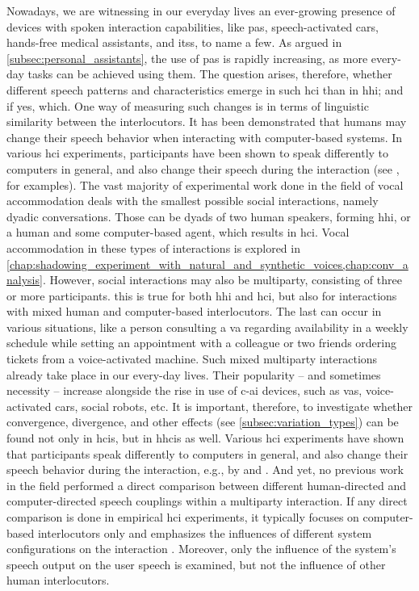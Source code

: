 Nowadays, we are witnessing in our everyday lives an ever-growing presence of devices with spoken interaction capabilities, like \acp{pa}, speech-activated cars, hands-free medical assistants, and \acp{its}, to name a few.
As argued in \cref{subsec:personal_assistants}, the use of \acp{pa} is rapidly increasing, as more every-day tasks can be achieved using them.
The question arises, therefore, whether different speech patterns and characteristics emerge in such \ac{hci} than in \ac{hhi}; and if yes, which.
One way of measuring such changes is in terms of linguistic similarity between the interlocutors.
It has been demonstrated that humans may change their speech behavior when interacting with computer-based systems.
In various \ac{hci} experiments, participants have been shown to speak differently to computers in general, and also change their speech during the interaction (see \citet{Branigan2010linguistic}, for examples).
The vast majority of experimental work done in the field of vocal accommodation deals with the smallest possible social interactions, namely dyadic conversations.
Those can be dyads of two human speakers, forming \ac{hhi}, or a human and some computer-based agent, which results in \ac{hci}.
Vocal accommodation in these types of interactions is explored in \cref{chap:shadowing_experiment_with_natural_and_synthetic_voices,chap:conv_analysis}.
However, social interactions may also be multiparty, consisting of three or more participants.
this is true for both \ac{hhi} and \ac{hci}, but also for interactions with mixed human and computer-based interlocutors.
The last can occur in various situations, like a person consulting a \ac{va} regarding availability in a weekly schedule while setting an appointment with a colleague or two friends ordering tickets from a voice-activated machine.
Such mixed multiparty interactions already take place in our every-day lives.
Their popularity -- and sometimes necessity -- increase alongside the rise in use of \ac{c-ai} devices, such as \acp{va}, voice-activated cars, social robots, etc.
It is important, therefore, to investigate whether convergence, divergence, and other effects (see \cref{subsec:variation_types}) can be found not only in \aclp{hci}, but in \acp{hhci} as well.
Various \ac{hci} experiments have shown that participants speak differently to computers in general, and also change their speech behavior during the interaction, e.g., by \citet{Branigan2010linguistic} and \citet{Levitan2016implementing}.
And yet, no previous work in the field performed a direct comparison between different human-directed and computer-directed speech couplings within a multiparty interaction.
If any direct comparison is done in empirical \ac{hci} experiments, it typically focuses on computer-based interlocutors only and emphasizes the influences of different system configurations on the interaction \citep[e.g.,][]{Levitan2016implementing}.
Moreover, only the influence of the system's speech output on the user speech is examined, but not the influence of other human interlocutors.

